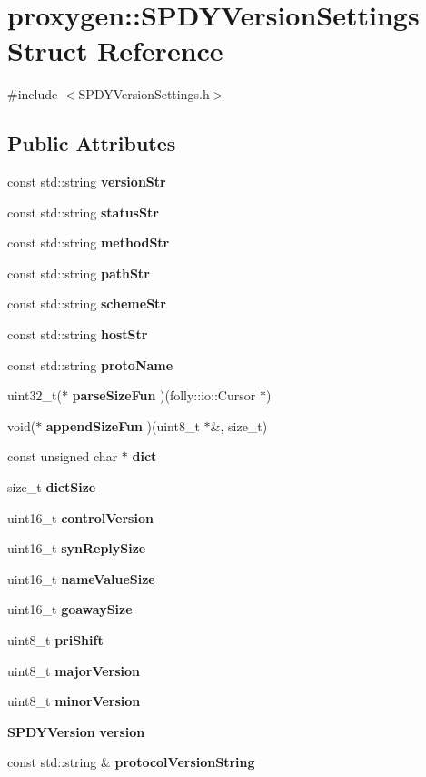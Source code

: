\section{proxygen\+:\+:S\+P\+D\+Y\+Version\+Settings Struct Reference}
\label{structproxygen_1_1SPDYVersionSettings}


{\ttfamily \#include $<$S\+P\+D\+Y\+Version\+Settings.\+h$>$}

\subsection*{Public Attributes}
\begin{DoxyCompactItemize}
\item 
const std\+::string {\bf version\+Str}
\item 
const std\+::string {\bf status\+Str}
\item 
const std\+::string {\bf method\+Str}
\item 
const std\+::string {\bf path\+Str}
\item 
const std\+::string {\bf scheme\+Str}
\item 
const std\+::string {\bf host\+Str}
\item 
const std\+::string {\bf proto\+Name}
\item 
uint32\+\_\+t($\ast$ {\bf parse\+Size\+Fun} )(folly\+::io\+::\+Cursor $\ast$)
\item 
void($\ast$ {\bf append\+Size\+Fun} )(uint8\+\_\+t $\ast$\&, size\+\_\+t)
\item 
const unsigned char $\ast$ {\bf dict}
\item 
size\+\_\+t {\bf dict\+Size}
\item 
uint16\+\_\+t {\bf control\+Version}
\item 
uint16\+\_\+t {\bf syn\+Reply\+Size}
\item 
uint16\+\_\+t {\bf name\+Value\+Size}
\item 
uint16\+\_\+t {\bf goaway\+Size}
\item 
uint8\+\_\+t {\bf pri\+Shift}
\item 
uint8\+\_\+t {\bf major\+Version}
\item 
uint8\+\_\+t {\bf minor\+Version}
\item 
{\bf S\+P\+D\+Y\+Version} {\bf version}
\item 
const std\+::string \& {\bf protocol\+Version\+String}
\end{DoxyCompactItemize}


